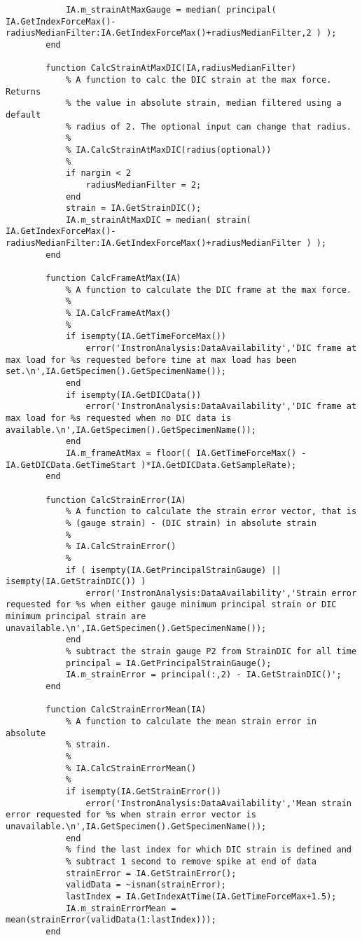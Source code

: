 \begin{lstlisting}
            IA.m_strainAtMaxGauge = median( principal( IA.GetIndexForceMax()-radiusMedianFilter:IA.GetIndexForceMax()+radiusMedianFilter,2 ) );
        end

        function CalcStrainAtMaxDIC(IA,radiusMedianFilter)
            % A function to calc the DIC strain at the max force. Returns
            % the value in absolute strain, median filtered using a default
            % radius of 2. The optional input can change that radius.
            %
            % IA.CalcStrainAtMaxDIC(radius(optional))
            %
            if nargin < 2
                radiusMedianFilter = 2;
            end
            strain = IA.GetStrainDIC();
            IA.m_strainAtMaxDIC = median( strain( IA.GetIndexForceMax()-radiusMedianFilter:IA.GetIndexForceMax()+radiusMedianFilter ) );
        end

        function CalcFrameAtMax(IA)
            % A function to calculate the DIC frame at the max force.
            %
            % IA.CalcFrameAtMax()
            %
            if isempty(IA.GetTimeForceMax())
                error('InstronAnalysis:DataAvailability','DIC frame at max load for %s requested before time at max load has been set.\n',IA.GetSpecimen().GetSpecimenName());
            end
            if isempty(IA.GetDICData())
                error('InstronAnalysis:DataAvailability','DIC frame at max load for %s requested when no DIC data is available.\n',IA.GetSpecimen().GetSpecimenName());
            end
            IA.m_frameAtMax = floor(( IA.GetTimeForceMax() - IA.GetDICData.GetTimeStart )*IA.GetDICData.GetSampleRate);
        end

        function CalcStrainError(IA)
            % A function to calculate the strain error vector, that is
            % (gauge strain) - (DIC strain) in absolute strain
            %
            % IA.CalcStrainError()
            %
            if ( isempty(IA.GetPrincipalStrainGauge) || isempty(IA.GetStrainDIC()) )
                error('InstronAnalysis:DataAvailability','Strain error requested for %s when either gauge minimum principal strain or DIC minimum principal strain are unavailable.\n',IA.GetSpecimen().GetSpecimenName());
            end
            % subtract the strain gauge P2 from StrainDIC for all time
            principal = IA.GetPrincipalStrainGauge();
            IA.m_strainError = principal(:,2) - IA.GetStrainDIC()';
        end

        function CalcStrainErrorMean(IA)
            % A function to calculate the mean strain error in absolute
            % strain.
            %
            % IA.CalcStrainErrorMean()
            %
            if isempty(IA.GetStrainError())
                error('InstronAnalysis:DataAvailability','Mean strain error requested for %s when strain error vector is unavailable.\n',IA.GetSpecimen().GetSpecimenName());
            end
            % find the last index for which DIC strain is defined and
            % subtract 1 second to remove spike at end of data
            strainError = IA.GetStrainError();
            validData = ~isnan(strainError);
            lastIndex = IA.GetIndexAtTime(IA.GetTimeForceMax+1.5);                     
            IA.m_strainErrorMean = mean(strainError(validData(1:lastIndex)));
        end


\end{lstlisting}
